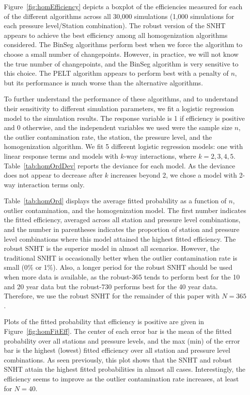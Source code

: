 \documentclass[12pt]{article}
\begin{document}
\begin{doublespacing}
Figure~\ref{fig:homEfficiency} depicts a boxplot of the efficiencies measured for each of the different algorithms across all 30,000 simulations (1,000 simulations for each pressure level/Station combination).  The robust version of the SNHT appears to achieve the best efficiency among all homogenization algorithms considered.  The BinSeg algorithms perform best when we force the algorithm to choose a small number of changepoints.  However, in practice, we will not know the true number of changepoints, and the BinSeg algorithm is very sensitive to this choice.  The PELT algorithm appears to perform best with a penalty of $n$, but its performance is much worse than the alternative algorithms.

To further understand the performance of these algorithms, and to understand their sensitivity to different simulation parameters, we fit a logistic regression model to the simulation results.  The response variable is 1 if efficiency is positive and 0 otherwise, and the independent variables we used were the sample size $n$, the outlier contamination rate, the station, the pressure level, and the homogenization algorithm.  We fit 5 different logistic regression models: one with linear response terms and models with $k$-way interactions, where $k=2,3,4,5$.  Table~\ref{tab:homOrdDev} reports the deviance for each model.  As the deviance does not appear to decrease after $k$ increases beyond 2, we chose a model with 2-way interaction terms only.

Table~\ref{tab:homOrd} displays the average fitted probability as a function of $n$, outlier contamination, and the homogenization model.  The first number indicates the fitted efficiency, averaged across all station and pressure level combinations, and the number in parentheses indicates the proportion of station and pressure level combinations where this model attained the highest fitted efficiency.  The robust SNHT is the superior model in almost all scenarios.  However, the traditional SNHT is occasionally better when the outlier contamination rate is small (0\% or 1\%).  Also, a longer period for the robust SNHT should be used when more data is available, as the robust-365 tends to perform best for the 10 and 20 year data but the robust-730 performs best for the 40 year data.  Therefore, we use the robust SNHT for the remainder of this paper with $N=365$.

Plots of the fitted probability that efficiency is positive are given in Figure~\ref{fig:homFitEff}.  The center of each error bar is the mean of the fitted probability over all stations and pressure levels, and the max (min) of the error bar is the highest (lowest) fitted efficiency over all station and pressure level combinations.  As seen previously, this plot shows that the SNHT and robust SNHT attain the highest fitted probabilities in almost all cases.  Interestingly, the efficiency seems to improve as the outlier contamination rate increases, at least for $N=40$.


\end{doublespacing}
\end{document}
